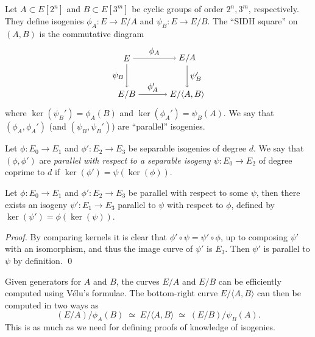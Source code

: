 Let $A \subset E[2^n]$ and $B \subset E[3^m]$ be cyclic groups of order $2^n, 3^m$, respectively.
They define isogenies $\phi_A : E \to E/A$ and $\psi_B : E \to E/B$.
The ``SIDH square'' on $(A,B)$ is the commutative diagram 
%
\begin{equation}
    \label{eq:sidh-square}
    \tikz[x=2.5cm,y=-1.5cm,baseline=-.75cm]{
    \node (E0) at (0,0) {$E$};
    \node (E1) at (1,0) {$E/A$};
    \node (E2) at (0,1) {$E/B$};
    \node (E3) at (1,1) {$E/\langle A, B\rangle$};
    \draw[->] (E0) edge node[above] {$\phi_A$} (E1)
    (E0) edge node[left] {$\psi_B$} (E2)
    (E1) edge node[right] {$\psi_B'$} (E3)
    (E2) edge node[above] {$\phi_A'$} (E3);
    }
\end{equation}
where $\ker(\psi_B')  = \phi_A(B)$ and $\ker( \phi_A' ) = \psi_B(A)$.
%
We say that $(\phi_A,\phi_A')$ (and $(\psi_B,\psi_B')$) are ``parallel'' isogenies.

\begin{definition}
  Let $\phi : E_0 \to E_1$ and $\phi' : E_2 \to E_3$ be separable isogenies of degree $d$.
  We say that $(\phi,\phi')$ are \emph{parallel with respect to a separable isogeny $\psi : E_0 \to E_2$} of degree coprime to $d$ if $\ker(\phi') = \psi(\ker(\phi))$.
\end{definition}

\begin{lemma}
  Let $\phi : E_0 \to E_1$ and $\phi' : E_2 \to E_3$ be parallel with respect to some $\psi$, then there exists an isogeny $\psi' : E_1 \to E_3$ parallel to $\psi$ with respect to $\phi$, defined by $\ker(\psi') = \phi(\ker(\psi))$.
\end{lemma}
\begin{proof}
  By comparing kernels it is clear that $\phi' \circ \psi = \psi' \circ \phi$, up to composing $\psi'$ with an isomorphism, and thus the image curve of $\psi'$ is $E_3$.
  Then $\psi'$ is parallel to $\psi$ by definition. \qed
\end{proof}

Given generators for $A$ and $B$, the curves $E/A$ and $E/B$ can be efficiently computed using Vélu's formulae.
The bottom-right curve $E/\langle A,B\rangle$ can then be computed in two ways as
\begin{equation}
  \label{eq:sidh-push}
  (E/A)/\phi_A(B) \;\simeq\; E/\langle A,B\rangle \;\simeq\; (E/B)/\psi_B(A).
\end{equation}
This is as much as we need for defining proofs of knowledge of isogenies.




